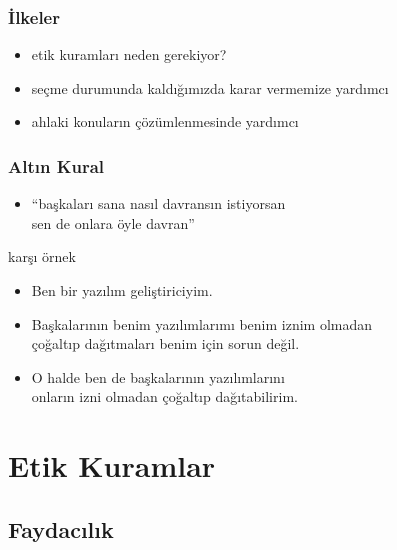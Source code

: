 \documentclass[dvipsnames]{beamer}
\theoremstyle{plain}
\begin{document}
\begin{frame}
  \frametitle{İlkeler}

  \begin{itemize}
    \item etik kuramları neden gerekiyor?

    \medskip
    \item seçme durumunda kaldığımızda karar vermemize yardımcı
    \item ahlaki konuların çözümlenmesinde yardımcı
  \end{itemize}
\end{frame}

\begin{frame}
  \frametitle{Altın Kural}

  \begin{itemize}
    \item ``başkaları sana nasıl davransın istiyorsan\\
      sen de onlara öyle davran''
  \end{itemize}

  \pause
  \medskip
  \begin{exampleblock}{karşı örnek}
    \begin{itemize}
      \item Ben bir yazılım geliştiriciyim.
      \item Başkalarının benim yazılımlarımı benim iznim olmadan\\
        çoğaltıp dağıtmaları benim için sorun değil.
      \item O halde ben de başkalarının yazılımlarını\\
        onların izni olmadan çoğaltıp dağıtabilirim.
    \end{itemize}
  \end{exampleblock}
\end{frame}

\section{Etik Kuramlar}

\subsection{Faydacılık}
\end{document}

